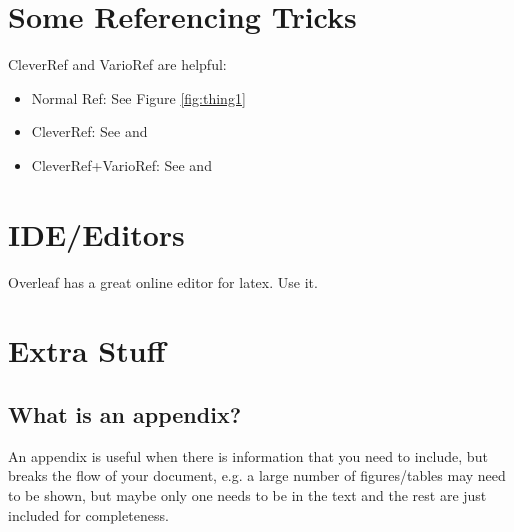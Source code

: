 \documentclass[a4paper,twoside,12pt]{report}
\begin{document}
\chapter{Some Referencing Tricks}
CleverRef and VarioRef are helpful:
\begin{itemize}
  \item Normal Ref: See Figure \ref{fig:thing1}
  \item CleverRef: See  and 
  \item CleverRef+VarioRef: See  and 
\end{itemize}

\chapter{IDE/Editors}
Overleaf has a great online editor for latex. Use it. 

\appendix
\chapter{Extra Stuff}\label{app:extra}
\section{What is an appendix?}\label{app:whatis}

An appendix is useful when there is information that you need to include, but breaks the flow of your document, e.g. a large number of figures/tables may need to be shown, but maybe only one needs to be in the text and the rest are just included for completeness.

\nocite{*}

\end{document}
